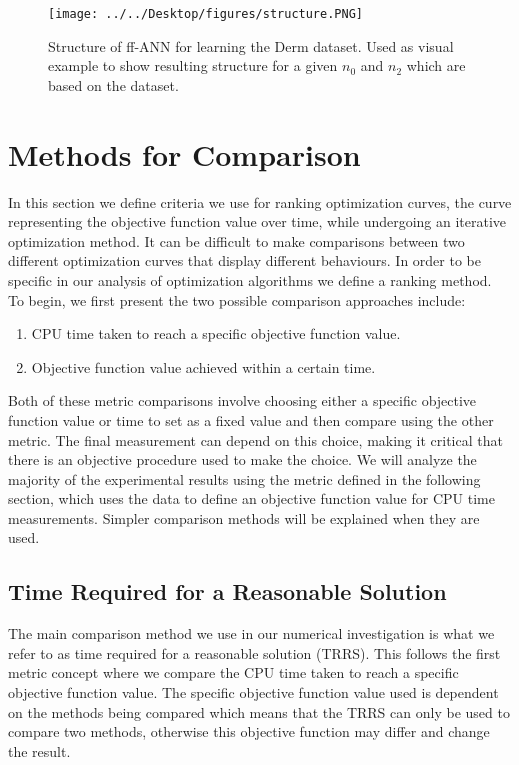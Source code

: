 \documentclass[letterpaper,12pt,titlepage,oneside,final]{book}
\begin{document}
	
	\begin{figure}[h]
		\centering
		\texttt{[image: ../../Desktop/figures/structure.PNG]}
		\caption{Structure of ff-ANN for learning the Derm dataset. Used as visual example to show resulting structure for a given $n_{0}$ and $n_{2}$ which are based on the dataset.}
		\label{figure:structure}
	\end{figure}

	
	\section{Methods for Comparison}
	
	In this section we define criteria we use for ranking optimization curves, the curve representing the objective function value over time, while undergoing an iterative optimization method. It can be difficult to make comparisons between two different optimization curves that display different behaviours. In order to be specific in our analysis of optimization algorithms we define a ranking method. To begin, we first present the two possible comparison approaches include:
	\begin{enumerate}
		\item CPU time taken to reach a specific objective function value.
		\item Objective function value achieved within a certain time.
	\end{enumerate}
	
	Both of these metric comparisons involve choosing either a specific objective function value or time to set as a fixed value and then compare using the other metric. The final measurement can depend on this choice, making it critical that there is an objective procedure used to make the choice. We will analyze the majority of the experimental results using the metric defined in the following section, which uses the data to define an objective function value for CPU time measurements. Simpler comparison methods will be explained when they are used.
	
	\subsection{Time Required for a Reasonable Solution}
	
	The main comparison method we use in our numerical investigation is what we refer to as time required for a reasonable solution (TRRS). This follows the first metric concept where we compare the CPU time taken to reach a specific objective function value. The specific objective function value used is dependent on the methods being compared which means that the TRRS can only be used to compare two methods, otherwise this objective function may differ and change the result. 
	
\end{document}
